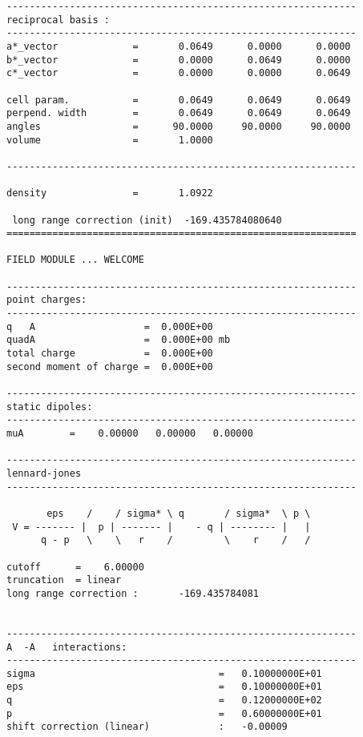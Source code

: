 \documentclass[a4paper,8pt]{article}
\begin{document}
\begin{verbatim}
-------------------------------------------------------------
reciprocal basis : 
-------------------------------------------------------------
a*_vector             =       0.0649      0.0000      0.0000
b*_vector             =       0.0000      0.0649      0.0000
c*_vector             =       0.0000      0.0000      0.0649

cell param.           =       0.0649      0.0649      0.0649
perpend. width        =       0.0649      0.0649      0.0649
angles                =      90.0000     90.0000     90.0000
volume                =       1.0000

-------------------------------------------------------------

density               =       1.0922

 long range correction (init)  -169.435784080640     
=============================================================

FIELD MODULE ... WELCOME

-------------------------------------------------------------
point charges: 
-------------------------------------------------------------
q   A                   =  0.000E+00
quadA                   =  0.000E+00 mb
total charge            =  0.000E+00
second moment of charge =  0.000E+00

-------------------------------------------------------------
static dipoles: 
-------------------------------------------------------------
muA        =    0.00000   0.00000   0.00000

-------------------------------------------------------------
lennard-jones           
-------------------------------------------------------------

       eps    /    / sigma* \ q       / sigma*  \ p \
 V = ------- |  p | ------- |    - q | -------- |   |
      q - p   \    \   r    /         \    r    /   /

cutoff      =    6.00000
truncation  = linear                                                      
long range correction :       -169.435784081


-------------------------------------------------------------
A  -A   interactions:
-------------------------------------------------------------
sigma                                =   0.10000000E+01
eps                                  =   0.10000000E+01
q                                    =   0.12000000E+02
p                                    =   0.60000000E+01
shift correction (linear)            :   -0.00009



\end{verbatim}
\end{document}
